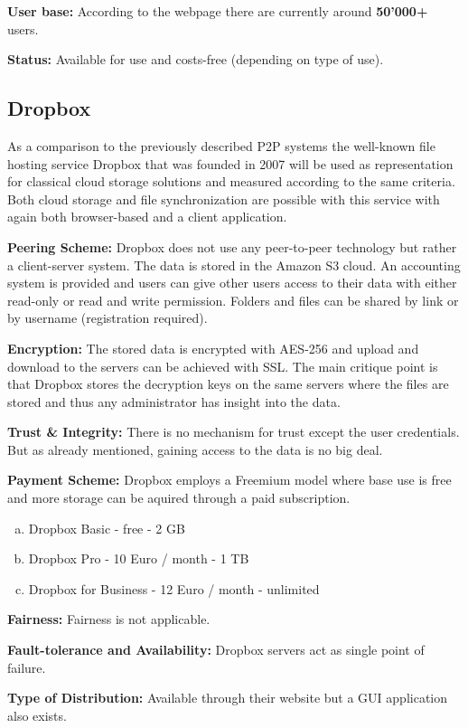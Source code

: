 \textbf{User base:} According to the webpage \cite{aerofs} there are currently around \textbf{50'000\textsc{+}} users.

\textbf{Status:} Available for use and costs-free (depending on type of use).

\subsection{Dropbox}
As a comparison to the previously described P2P systems the well-known file hosting service Dropbox that was founded in 2007 will be used as representation for classical cloud storage solutions and measured according to the same criteria. Both cloud storage and file synchronization are possible with this service with again both browser-based and a client application.

\textbf{Peering Scheme:} Dropbox does not use any peer-to-peer technology but rather a client-server system. The data is stored in the Amazon S3 cloud. An accounting system is provided and users can give other users access to their data with either read-only or read and write permission. Folders and files can be shared by link or by username (registration required).

\textbf{Encryption:} The stored data is encrypted with AES-256 and upload and download to the servers can be achieved with SSL. The main critique point is that Dropbox stores the decryption keys on the same servers where the files are stored and thus any administrator has insight into the data.

\textbf{Trust \& Integrity:} There is no mechanism for trust except the user credentials. But as already mentioned, gaining access to the data is no big deal.

\textbf{Payment Scheme:} Dropbox employs a Freemium model where base use is free and more storage can be aquired through a paid subscription.
\begin{enumerate}[(a)]
	\item Dropbox Basic - free - 2 GB
	\item Dropbox Pro - 10 Euro / month - 1 TB
	\item Dropbox for Business - 12 Euro / month - unlimited
\end{enumerate}

\textbf{Fairness:} Fairness is not applicable.

\textbf{Fault-tolerance and Availability:} Dropbox servers act as single point of failure.

\textbf{Type of Distribution:} Available through their website but a GUI application also exists.

